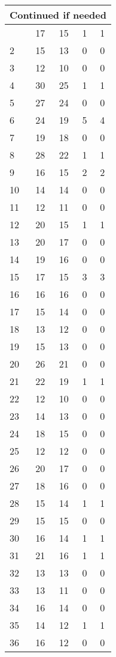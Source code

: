 \begin{center}
\begin{longtable}{l|c|c|c|c}
\hline \multicolumn{5}{|r|}{{Continued if needed}} \\ \hline
\endfoot 
1 & 17 & 15 & 1 & 1\\ \hline
2 & 15 & 13 & 0 & 0\\ \hline
3 & 12 & 10 & 0 & 0\\ \hline
4 & 30 & 25 & 1 & 1\\ \hline
5 & 27 & 24 & 0 & 0\\ \hline
6 & 24 & 19 & 5 & 4\\ \hline
7 & 19 & 18 & 0 & 0\\ \hline
8 & 28 & 22 & 1 & 1\\ \hline
9 & 16 & 15 & 2 & 2\\ \hline
10 & 14 & 14 & 0 & 0\\ \hline
11 & 12 & 11 & 0 & 0\\ \hline
12 & 20 & 15 & 1 & 1\\ \hline
13 & 20 & 17 & 0 & 0\\ \hline
14 & 19 & 16 & 0 & 0\\ \hline
15 & 17 & 15 & 3 & 3\\ \hline
16 & 16 & 16 & 0 & 0\\ \hline
17 & 15 & 14 & 0 & 0\\ \hline
18 & 13 & 12 & 0 & 0\\ \hline
19 & 15 & 13 & 0 & 0\\ \hline
20 & 26 & 21 & 0 & 0\\ \hline
21 & 22 & 19 & 1 & 1\\ \hline
22 & 12 & 10 & 0 & 0\\ \hline
23 & 14 & 13 & 0 & 0\\ \hline
24 & 18 & 15 & 0 & 0\\ \hline
25 & 12 & 12 & 0 & 0\\ \hline
26 & 20 & 17 & 0 & 0\\ \hline
27 & 18 & 16 & 0 & 0\\ \hline
28 & 15 & 14 & 1 & 1\\ \hline
29 & 15 & 15 & 0 & 0\\ \hline
30 & 16 & 14 & 1 & 1\\ \hline
31 & 21 & 16 & 1 & 1\\ \hline
32 & 13 & 13 & 0 & 0\\ \hline
33 & 13 & 11 & 0 & 0\\ \hline
34 & 16 & 14 & 0 & 0\\ \hline
35 & 14 & 12 & 1 & 1\\ \hline
36 & 16 & 12 & 0 & 0\\ \hline

\end{longtable}
\end{center}
